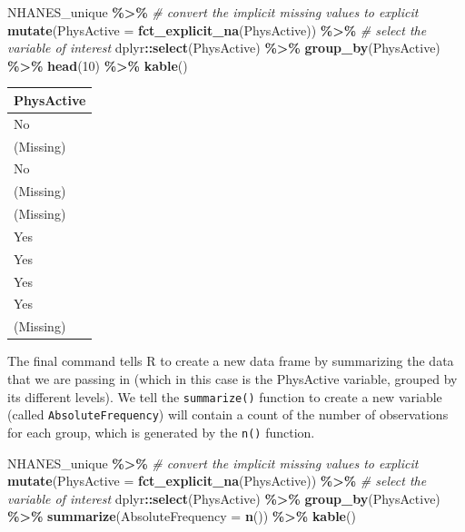 \documentclass[
  12pt,
]{book}
\newenvironment{Shaded}{\begin{snugshade}}{\end{snugshade}}
\newcommand{\AttributeTok}[1]{\textcolor[rgb]{0.13,0.29,0.53}{#1}}
\newcommand{\CommentTok}[1]{\textcolor[rgb]{0.56,0.35,0.01}{\textit{#1}}}
\newcommand{\DecValTok}[1]{\textcolor[rgb]{0.00,0.00,0.81}{#1}}
\newcommand{\FunctionTok}[1]{\textcolor[rgb]{0.13,0.29,0.53}{\textbf{#1}}}
\newcommand{\NormalTok}[1]{#1}
\newcommand{\SpecialCharTok}[1]{\textcolor[rgb]{0.81,0.36,0.00}{\textbf{#1}}}
\begin{document}
\begin{Shaded}
\begin{Highlighting}[]
\NormalTok{NHANES\_unique }\SpecialCharTok{\%\textgreater{}\%}
  \CommentTok{\# convert the implicit missing values to explicit}
  \FunctionTok{mutate}\NormalTok{(}\AttributeTok{PhysActive =} \FunctionTok{fct\_explicit\_na}\NormalTok{(PhysActive)) }\SpecialCharTok{\%\textgreater{}\%}
  \CommentTok{\# select the variable of interest}
\NormalTok{  dplyr}\SpecialCharTok{::}\FunctionTok{select}\NormalTok{(PhysActive) }\SpecialCharTok{\%\textgreater{}\%} 
  \FunctionTok{group\_by}\NormalTok{(PhysActive) }\SpecialCharTok{\%\textgreater{}\%}
  \FunctionTok{head}\NormalTok{(}\DecValTok{10}\NormalTok{) }\SpecialCharTok{\%\textgreater{}\%}
  \FunctionTok{kable}\NormalTok{()}
\end{Highlighting}
\end{Shaded}

\begin{tabular}{l}
\hline
PhysActive\\
\hline
No\\
\hline
(Missing)\\
\hline
No\\
\hline
(Missing)\\
\hline
(Missing)\\
\hline
Yes\\
\hline
Yes\\
\hline
Yes\\
\hline
Yes\\
\hline
(Missing)\\
\hline
\end{tabular}

The final command tells R to create a new data frame by summarizing the data that we are passing in (which in this case is the PhysActive variable, grouped by its different levels). We tell the \texttt{summarize()} function to create a new variable (called \texttt{AbsoluteFrequency}) will contain a count of the number of observations for each group, which is generated by the \texttt{n()} function.

\begin{Shaded}
\begin{Highlighting}[]
\NormalTok{NHANES\_unique }\SpecialCharTok{\%\textgreater{}\%}
  \CommentTok{\# convert the implicit missing values to explicit}
  \FunctionTok{mutate}\NormalTok{(}\AttributeTok{PhysActive =} \FunctionTok{fct\_explicit\_na}\NormalTok{(PhysActive)) }\SpecialCharTok{\%\textgreater{}\%}
  \CommentTok{\# select the variable of interest}
\NormalTok{  dplyr}\SpecialCharTok{::}\FunctionTok{select}\NormalTok{(PhysActive) }\SpecialCharTok{\%\textgreater{}\%} 
  \FunctionTok{group\_by}\NormalTok{(PhysActive) }\SpecialCharTok{\%\textgreater{}\%}
  \FunctionTok{summarize}\NormalTok{(}\AttributeTok{AbsoluteFrequency =} \FunctionTok{n}\NormalTok{())  }\SpecialCharTok{\%\textgreater{}\%}
  \FunctionTok{kable}\NormalTok{()}
\end{Highlighting}
\end{Shaded}
\end{document}
